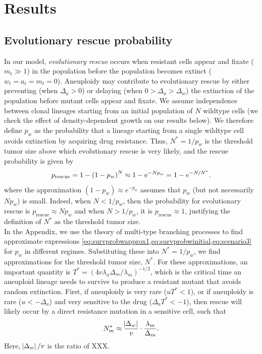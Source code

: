\documentclass[12pt]{extarticle}
\newcommand{\e}{{\rm e}}
\newcommand{\presc}{p_\text{rescue}}
\begin{document}

\section*{Results}


\subsection*{Evolutionary rescue probability}

In our model, \emph{evolutionary rescue} occurs when resistant cells appear and fixate ($m_t \gg 1$) in the population before the population becomes extinct ($w_t=a_t=m_t=0$).
Aneuploidy may contribute to evolutionary rescue by either preventing (when $\Delta_a>0$) or delaying (when $0>\Delta_a>\Delta_w$) the extinction of the population before mutant cells appear and fixate.
We assume independence between clonal lineages starting from an initial population of $N$ wildtype cells (we check the effect of density-dependent growth on our results below).
We therefore define $p_w$ as the probability that a lineage starting from a single wildtype cell avoids extinction by acquiring drug resistance.
Thus, $N^*=1/p_w$ is the threshold tumor size above which evolutionary rescue is very likely, and the rescue probability is given by 
\begin{equation} \label{eq:rescue_prob} 
\presc = 
1-\left(1-p_w\right)^N \approx
1-\e^{-Np_w} = 
1-e^{-N/N^*} .
\end{equation}
where the approximation $(1-p_w)\approx e^{-p_w}$ assumes that $p_w$ (but not necessarily $N p_w$) is small.
Indeed, when $N<1/p_w$, then the probability for evolutionary rescue is $\presc \approx N p_w$  and when $N > 1/p_w$, it is $\presc \approx 1$, justifying the definition of $N^*$ as the threshold tumor size. 
\\

In the Appendix, we use the theory of multi-type branching processes to find approximate expressions \cref{eq:survprobwapprox1,eq:survprobwinitial,eq:scenario3} for $p_w$ in different regimes. 
Substituting these  into $N^*=1/p_w$, we find approximations for the threshold tumor size, $N^*$. 
For these approximations, an important quantity is $T^* = (4 v \lambda_a \Delta_m/\lambda_m)^{-1/2}$, which is the critical time an aneuploid lineage needs to survive to produce a resistant mutant that avoids random extinction.
First, if aneuploidy is very rare ($u T^*< 1$), or if aneuploidy is rare ($u < -\Delta_a$) and very sensitive to the drug ($\Delta_a T^* < -1$), then rescue will likely occur by a direct resistance mutation in a sensitive cell, such that 
\begin{equation} \label{eq:N_m}
N_m^* \approx \frac{\abs{\Delta_w}}{v} \cdot \frac{\lambda_m}{\Delta_m} .
\end{equation}
Here, $\abs{\Delta_w}/v$ is the ratio of XXX.
\end{document}
